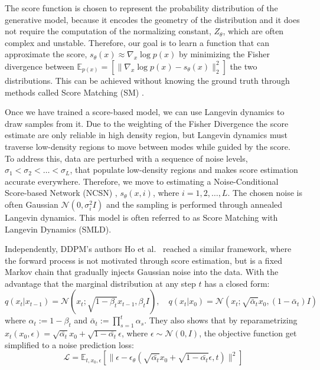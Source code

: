 The score function is chosen to represent the probability distribution of the generative model, because it encodes the geometry of the distribution and it does not require the computation of the normalizing constant, $Z_\theta$, which are often complex and unstable. Therefore, our goal is to learn a function that can approximate the score, \(s_\theta(x)\approx\nabla_x \log p(x)\) by minimizing the Fisher divergence between \(\mathbb{E}_{p(x)}=\left[\|\nabla_x\log p(x)-s_\theta (x)\|^2_2\right]\) the two distributions. This can be achieved without knowing the ground truth through methods called Score Matching (SM) \cite{hyvarinen2005estimation, vincent2011connection}. 

Once we have trained a score-based model, we can use Langevin dynamics \cite{parisi1981correlation} to draw samples from it. Due to the weighting of the Fisher Divergence the score estimate are only reliable in high density region, but Langevin dynamics must traverse low-density regions to move between modes while guided by the score. To address this, data are perturbed with a sequence of noise levels, \(\sigma_1< \sigma_2< \dots<\sigma_L\), that populate low-density regions and makes score estimation accurate everywhere. Therefore, we move to estimating a Noise-Conditional Score-based Network (NCSN) \cite{song2019generative}, \(s_\theta(x,i)\), where \(i=1,2,\dots,L\). The chosen noise is often Gaussian \(\mathcal{N}(0,\sigma_i^2I)\) and the sampling is performed through annealed Langevin dynamics. This model is often referred to as Score Matching with Langevin Dynamics (SMLD). 

Independently, DDPM's authors Ho et al.\ \cite{ho2020ddpm} reached a similar framework, where the forward process is not motivated through score estimation, but is a fixed Markov chain that gradually injects Gaussian noise into the data. With the advantage that the marginal distribution at any step \(t\) has a closed form:
$$q(x_t|x_{t-1})=\mathcal{N}\left(x_t;\sqrt{1-\beta_t}x_{t-1}, \beta_tI\right), \quad q(x_t|x_0)=\mathcal{N}\left(x_t;\sqrt{\bar{\alpha}_t}x_0, (1-\bar{\alpha}_t)I\right)$$
where \(\alpha_t:=1-\beta_t\) and \(\bar{\alpha}_t:=\prod_{s=1}^t\alpha_s\). They also shows that by reparametrizing \(x_t(x_0,\epsilon)=\sqrt{\bar{\alpha_t}}x_0+\sqrt{1-\bar{\alpha_t}}\epsilon\), where \(\epsilon \sim \mathcal{N}(0,I)\), the objective function get simplified to a noise prediction loss:
\begin{equation}
\label{eq:ddpm_noise_loss}
\mathcal{L}=\mathbb{E}_{t,x_0,\epsilon}\left[\|\epsilon -\epsilon_\theta(\sqrt{\bar{\alpha_t}}x_0+\sqrt{1-\bar{\alpha_t}}\epsilon,t)\|^2\right]
\end{equation}

